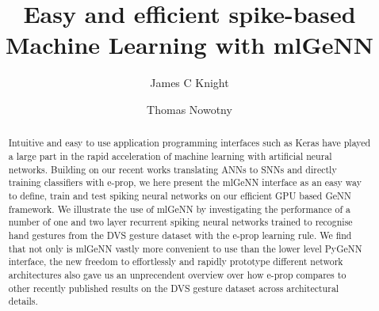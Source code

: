 \documentclass[sigconf]{acmart}
\begin{document}
\title{Easy and efficient spike-based Machine Learning with mlGeNN}

\author{James C Knight}

\author{Thomas Nowotny}
\renewcommand{\shortauthors}{Knight and Nowotny}

\begin{abstract}
  Intuitive and easy to use application programming interfaces such as Keras have played a large part in the rapid acceleration of machine learning with artificial neural networks.
  Building on our recent works translating ANNs to SNNs and directly training classifiers with e-prop, we here present the mlGeNN interface as an easy way to define, train and test spiking neural networks on our efficient GPU based GeNN framework.
  We illustrate the use of mlGeNN by investigating the performance of a number of one and two layer recurrent spiking neural networks trained to recognise hand gestures from the DVS gesture dataset with the e-prop learning rule.
  We find that not only is mlGeNN vastly more convenient to use than the lower level PyGeNN interface, the new freedom to effortlessly and rapidly prototype different network architectures also gave us an unprecendent overview over how e-prop compares to other recently published results on the DVS gesture dataset across architectural details. 
\end{abstract}
\end{document}
